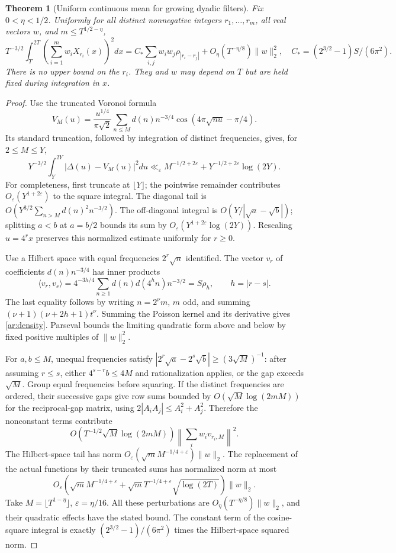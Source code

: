 \documentclass[11pt,a4paper]{article}
\newtheorem{theorem}{Theorem}[section]
\theoremstyle{definition}
\theoremstyle{remark}
\numberwithin{equation}{section}
\begin{document}
\begin{theorem}[Uniform continuous mean for growing dyadic filters]
\label{ar:uniform}
Fix $0<\eta<1/2$.  Uniformly for all distinct nonnegative integers
$r_1,\ldots,r_m$, all real vectors $w$, and $m\le T^{1/2-\eta}$,
\[
 T^{-3/2}\int_T^{2T}\left(\sum_{i=1}^mw_iX_{r_i}(x)\right)^2dx
 =C_*\sum_{i,j}w_iw_j\rho_{|r_i-r_j|}
 +O_\eta(T^{-\eta/8})\|w\|_2^2,
 \quad C_*=(2^{3/2}-1)S/(6\pi^2).
\]
There is no upper bound on the $r_i$.  They and $w$ may depend on $T$ but
are held fixed during integration in $x$.
\end{theorem}
\begin{proof}
Use the truncated Voronoi formula \cite{ar:LauTsang}
\[
 V_M(u)=\frac{u^{1/4}}{\pi\sqrt2}\sum_{n\le M}
 d(n)n^{-3/4}\cos(4\pi\sqrt{nu}-\pi/4).
\]
Its standard truncation, followed by integration of distinct frequencies,
gives, for $2\le M\le Y$,
\[
 Y^{-3/2}\int_Y^{2Y}|\Delta(u)-V_M(u)|^2du
 \ll_\varepsilon M^{-1/2+2\varepsilon}
       +Y^{-1/2+2\varepsilon}\log(2Y).
\]
For completeness, first truncate at $\lfloor Y\rfloor$; the pointwise
remainder contributes $O_\varepsilon(Y^{1+2\varepsilon})$ to the square
integral.  The diagonal tail is
$O(Y^{3/2}\sum_{n>M}d(n)^2n^{-3/2})$.  The off-diagonal integral is
$O(Y/|\sqrt a-\sqrt b|)$; splitting $a<b$ at $a=b/2$ bounds its sum by
$O_\varepsilon(Y^{1+2\varepsilon}\log(2Y))$.
Rescaling $u=4^rx$ preserves this normalized estimate uniformly for $r\ge0$.

Use a Hilbert space with equal frequencies $2^r\sqrt n$ identified.  The
vector $v_r$ of coefficients $d(n)n^{-3/4}$ has inner products
\[
 \langle v_r,v_s\rangle
 =4^{-3h/4}\sum_{n\ge1}d(n)d(4^hn)n^{-3/2}=S\rho_h,
 \qquad h=|r-s|.
\]
The last equality follows by writing $n=2^\nu m$, $m$ odd, and summing
$(\nu+1)(\nu+2h+1)t^\nu$.  Summing the Poisson kernel and its derivative
gives \eqref{ar:density}.  Parseval bounds the limiting quadratic form above
and below by fixed positive multiples of $\|w\|_2^2$.

For $a,b\le M$, unequal frequencies satisfy
$|2^r\sqrt a-2^s\sqrt b|\ge(3\sqrt M)^{-1}$: after assuming $r\le s$,
either $4^{s-r}b\le4M$ and rationalization applies, or the gap exceeds
$\sqrt M$.  Group equal frequencies before squaring.  If the distinct
frequencies are ordered, their successive gaps give row sums bounded by
$O(\sqrt M\log(2mM))$ for the reciprocal-gap matrix, using
$2|A_iA_j|\le A_i^2+A_j^2$.  Therefore the nonconstant terms contribute
\[
 O(T^{-1/2}\sqrt M\log(2mM))
 \left\|\sum_iw_iv_{r_i,M}\right\|^2.
\]
The Hilbert-space tail has norm
$O_\varepsilon(\sqrt mM^{-1/4+\varepsilon})\|w\|_2$.
The replacement of the actual functions by their truncated sums has
normalized norm at most
\[
 O_\varepsilon\left(\sqrt mM^{-1/4+\varepsilon}
 +\sqrt mT^{-1/4+\varepsilon}\sqrt{\log(2T)}\right)\|w\|_2.
\]
Take $M=\lfloor T^{1-\eta}\rfloor$, $\varepsilon=\eta/16$.  All these
perturbations are $O_\eta(T^{-\eta/8})\|w\|_2$, and their quadratic effects
have the stated bound.  The constant term of the cosine-square integral
is exactly $(2^{3/2}-1)/(6\pi^2)$ times the Hilbert-space squared norm.
\end{proof}
\end{document}
